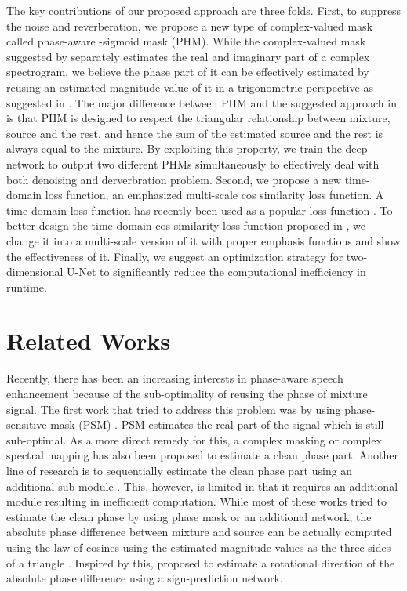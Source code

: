 \documentclass[a4paper]{article}
\begin{document}
The key contributions of our proposed approach are three folds.
First, to suppress the noise and reverberation, we propose a new type of complex-valued mask called phase-aware -sigmoid mask (PHM).
While the complex-valued mask suggested by \cite{williamson2016complex} separately estimates the real and imaginary part of a complex spectrogram, we believe the phase part of it can be effectively estimated by reusing an estimated magnitude value of it in a trigonometric perspective as suggested in \cite{wang2019masking}.
The major difference between PHM and the suggested approach in \cite{wang2019masking} is that PHM is designed to respect the triangular relationship between mixture, source and the rest, and hence the sum of the estimated source and the rest is always equal to the mixture.
By exploiting this property, we train the deep network to output two different PHMs simultaneously to effectively deal with both denoising and derverbration problem.
Second, we propose a new time-domain loss function, an emphasized multi-scale cos similarity loss function.
A time-domain loss function has recently been used as a popular loss function \cite{choi2019phase, yao2019coarse, wang2018end, koizumi2020speech, le2019sdr}.
To better design the time-domain cos similarity loss function proposed in \cite{choi2019phase}, we change it into a multi-scale version of it with proper emphasis functions and show the effectiveness of it.
Finally, we suggest an optimization strategy for two-dimensional U-Net to significantly reduce the computational inefficiency in runtime.

\section{Related Works}
Recently, there has been an increasing interests in phase-aware speech enhancement because of the sub-optimality of reusing the phase of mixture signal.
The first work that tried to address this problem was by using phase-sensitive mask (PSM) \cite{erdogan2015phase}. PSM estimates the real-part of the signal which is still sub-optimal.
As a more direct remedy for this, a complex masking \cite{williamson2016complex, choi2019phase, wang2019masking} or complex spectral mapping \cite{tan2019complex} has also been proposed to estimate a clean phase part.
Another line of research is to sequentially estimate the clean phase part using an additional sub-module \cite{takahashi2018phasenet, afouras2018conversation, yin2019phasen}. This, however, is limited in that it requires an additional module resulting in inefficient computation.
While most of these works tried to estimate the clean phase by using phase mask or an additional network, the absolute phase difference between mixture and source can be actually computed using the law of cosines using the estimated magnitude values as the three sides of a triangle \cite{mowlaee2012phase, mowlaee2014time}.
Inspired by this, \cite{wang2019deep} proposed to estimate a rotational direction of the absolute phase difference using a sign-prediction network.
\end{document}
